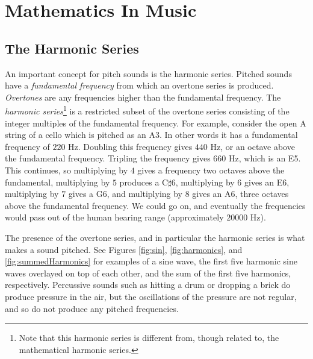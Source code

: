 \chapter{Mathematics In Music} \label{mathinmusic}

\section{The Harmonic Series} \label{mathinmusic:harmonic}

An important concept for pitch sounds is the harmonic series.
Pitched sounds have a \textit{fundamental frequency} from which an overtone series is produced.
\textit{Overtones} are any frequencies higher than the fundamental frequency.
The \textit{harmonic series}\footnote{Note that this harmonic series is different from, though related to, the mathematical harmonic series.} is a restricted subset of the overtone series consisting of the integer multiples of the fundamental frequency.
For example, consider the open A string of a cello which is pitched as an A3.
In other words it has a fundamental frequency of $220$ Hz.
Doubling this frequency gives $440$ Hz, or an octave above the fundamental frequency.
Tripling the frequency gives $660$ Hz, which is an E5.
This continues, so multiplying by $4$ gives a frequency two octaves above the fundamental, multiplying by $5$ produces a C$\sharp$6, multiplying by $6$ gives an E6, multiplying by $7$ gives a G6, and multiplying by $8$ gives an A6, three octaves above the fundamental frequency.
We could go on, and eventually the frequencies would pass out of the human hearing range (approximately $20000$ Hz).

The presence of the overtone series, and in particular the harmonic series is what makes a sound pitched.
See Figures \ref{fig:sin}, \ref{fig:harmonics}, and \ref{fig:summedHarmonics} for examples of a sine wave, the first five harmonic sine waves overlayed on top of each other, and the sum of the first five harmonics, respectively.
Percussive sounds such as hitting a drum or dropping a brick do produce pressure in the air, but the oscillations of the pressure are not regular, and so do not produce any pitched frequencies.


